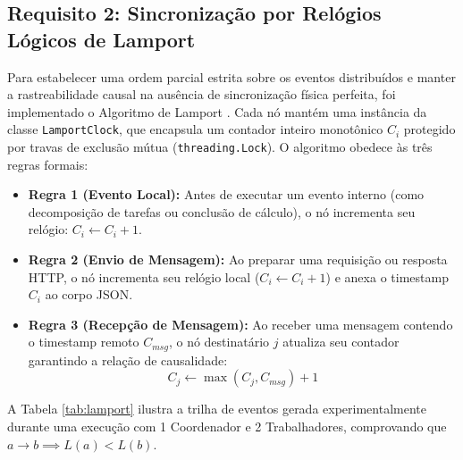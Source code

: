 \documentclass[12pt]{article}
\begin{document}
\subsection{Requisito 2: Sincronização por Relógios Lógicos de Lamport}
Para estabelecer uma ordem parcial estrita sobre os eventos distribuídos e manter a rastreabilidade causal na ausência de sincronização física perfeita, foi implementado o Algoritmo de Lamport \cite{lamport1978}. Cada nó mantém uma instância da classe \texttt{LamportClock}, que encapsula um contador inteiro monotônico $C_i$ protegido por travas de exclusão mútua (\texttt{threading.Lock}). O algoritmo obedece às três regras formais:

\begin{itemize}
    \item \textbf{Regra 1 (Evento Local):} Antes de executar um evento interno (como decomposição de tarefas ou conclusão de cálculo), o nó incrementa seu relógio: $C_i \leftarrow C_i + 1$.
    \item \textbf{Regra 2 (Envio de Mensagem):} Ao preparar uma requisição ou resposta HTTP, o nó incrementa seu relógio local ($C_i \leftarrow C_i + 1$) e anexa o timestamp $C_i$ ao corpo JSON.
    \item \textbf{Regra 3 (Recepção de Mensagem):} Ao receber uma mensagem contendo o timestamp remoto $C_{msg}$, o nó destinatário $j$ atualiza seu contador garantindo a relação de causalidade:
    \begin{equation}
    C_j \leftarrow \max(C_j, C_{msg}) + 1
    \end{equation}
\end{itemize}

A Tabela \ref{tab:lamport} ilustra a trilha de eventos gerada experimentalmente durante uma execução com 1 Coordenador e 2 Trabalhadores, comprovando que $a \to b \implies L(a) < L(b)$.
\end{document}
